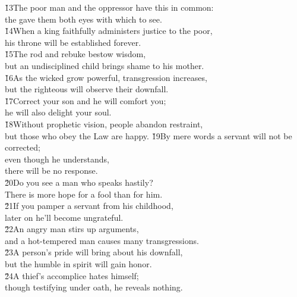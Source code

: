 \begin{poetry}
\poeml \v{13}The poor man and the oppressor have this in common: \\
\poemll    the  gave them both eyes with which to see. \\
\poeml \v{14}When a king faithfully administers justice to the poor, \\
\poemll    his throne will be established forever. \\
\poeml \v{15}The rod and rebuke bestow wisdom, \\
\poemll    but an undisciplined child brings shame to his mother. \\
\poeml \v{16}As the wicked grow powerful, transgression increases, \\
\poemll    but the righteous will observe their downfall. \\
\poeml \v{17}Correct your son and he will comfort you; \\
\poemll    he will also delight your soul. \\
\poeml \v{18}Without prophetic vision, people abandon restraint, \\
\poemll    but those who obey the Law are happy.
\poeml \v{19}By mere words a servant will not be corrected; \\
\poemll    even though he understands, \\
\poemlll       there will be no response. \\
\poeml \v{20}Do you see a man who speaks hastily? \\
\poemll    There is more hope for a fool than for him. \\
\poeml \v{21}If you pamper a servant from his childhood, \\
\poemll    later on he'll become ungrateful. \\
\poeml \v{22}An angry man stirs up arguments, \\
\poemll    and a hot-tempered man causes many transgressions. \\
\poeml \v{23}A person's pride will bring about his downfall, \\
\poemll    but the humble in spirit will gain honor. \\
\poeml \v{24}A thief's accomplice hates himself; \\
\poemll    though testifying under oath, he reveals nothing. \\

\end{poetry}
